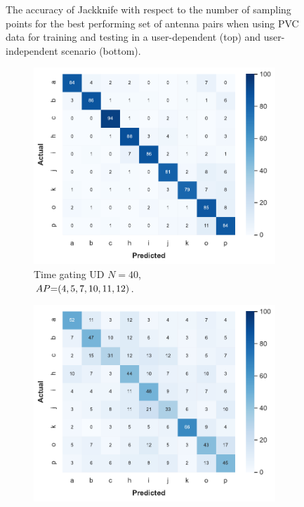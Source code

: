 \begin{figure}[ht]
  \vspace{-6pt}
  \caption{The accuracy of Jackknife with respect to the number of sampling points for the best performing set of antenna pairs when using PVC data for training and testing in a user-dependent (top) and user-independent scenario (bottom).}
  \label{fig:radar-experiments:through-materials:pvc-samples}
\end{figure}

\begin{figure}[ht]
  \begin{subfigure}{.49\textwidth}
    \centering
    \includegraphics[width=.99\linewidth]{Figures/RadarExperiments/Datasets/ThroughMaterials/PVC/confusion-timegating-ud.pdf}
    \vspace{-15pt}
    \captionsetup{width=.99\linewidth}
    \caption{Time gating UD $N{=}40$, \\ $\splitatcommas{AP{=}(4, 5, 7, 10, 11, 12)}$.}
    \label{fig:radar-experiments:through-materials:pvc-confusion:timegating-ud}
  \end{subfigure}
  \begin{subfigure}{.49\textwidth}
    \centering
    \includegraphics[width=.99\linewidth]{Figures/RadarExperiments/Datasets/ThroughMaterials/PVC/confusion-filtering-ud.pdf}

\end{subfigure}
\end{figure}
